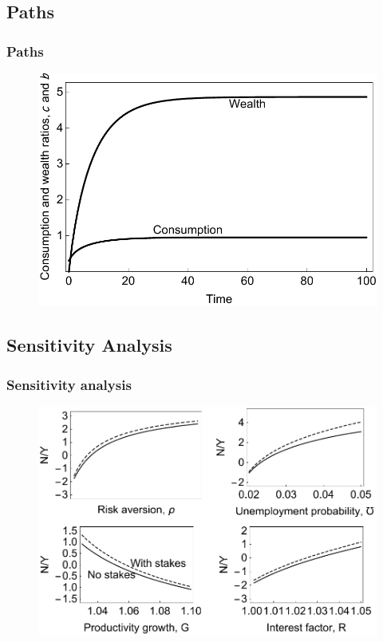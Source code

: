 \documentclass{beamer}
\begin{document}
\subsection{Paths}
\begin{frame}
\frametitle{Paths}
    \begin{figure}
    \centering
    \includegraphics[width=.6\textwidth]{../figures/paths.pdf}
    \end{figure}
  \end{frame}

\subsection{Sensitivity Analysis}

\begin{frame}
\frametitle{Sensitivity analysis}
    \begin{figure}
    \centering
    \includegraphics[width=.6\textwidth]{../figures/sensitivity.pdf}
    \end{figure}
\end{frame}

\end{document}
